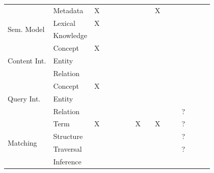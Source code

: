 \begin{table}[htbp]
\begin{tabular}{rrcccccccccccccc}
    \multicolumn{1}{l}{} & \multicolumn{1}{l}{Metadata} & X     &       &       &       &       &       &       & X     &       &       &       &       &       &  \\
    \multicolumn{1}{l}{\multirow{2}[0]{*}{Sem. Model}} & \multicolumn{1}{l}{Lexical} & X     &       &       &       &       &       &       &       &       &       &       &       &       &  \\
    \multicolumn{1}{l}{} & \multicolumn{1}{l}{Knowledge} &       &       &       &       &       &       &       &       &       &       &       &       &       &  \\
    \multicolumn{1}{l}{\multirow{3}[0]{*}{Content Int.}} & \multicolumn{1}{l}{Concept} & X     &       &       &       &       &       &       &       &       &       &       &       &       &  \\
    \multicolumn{1}{l}{} & \multicolumn{1}{l}{Entity} &       &       &       &       &       &       &       &       &       &       &       &       &       &  \\
    \multicolumn{1}{l}{} & \multicolumn{1}{l}{Relation} &       &       &       &       &       &       &       &       &       &       &       &       &       &  \\
    \multicolumn{1}{l}{\multirow{3}[0]{*}{Query Int.}} & \multicolumn{1}{l}{Concept} & X     &       &       &       &       &       &       &       &       &       &       &       &       &  \\
    \multicolumn{1}{l}{} & \multicolumn{1}{l}{Entity} &       &       &       &       &       &       &       &       &       &       &       &       &       &  \\
    \multicolumn{1}{l}{} & \multicolumn{1}{l}{Relation} &       &       &       &       &       &       &       &       &       &       & ?     &       &       &  \\
    \multicolumn{1}{l}{\multirow{4}[0]{*}{Matching}} & \multicolumn{1}{l}{Term} & X     &       &       &       &       & X     &       & X     &       &       & ?     &       &       &  \\
    \multicolumn{1}{l}{} & \multicolumn{1}{l}{Structure } &       &       &       &       &       &       &       &       &       &       & ?     &       &       &  \\
    \multicolumn{1}{l}{} & \multicolumn{1}{l}{Traversal} &       &       &       &       &       &       &       &       &       &       & ?     &       &       &  \\
    \multicolumn{1}{l}{} & \multicolumn{1}{l}{Inference} &       &       &       &       &       &       &       &       &       &       &       &       &       &  \\

\end{tabular}
\end{table}
